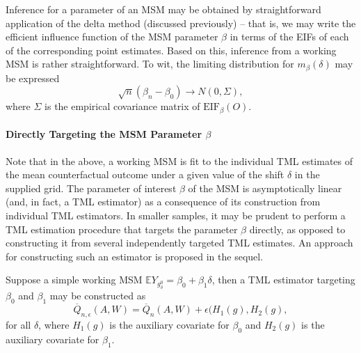 \documentclass[12pt, krantz2,]{krantz}
\newenvironment{Shaded}{\begin{snugshade}}{\end{snugshade}}
\newcommand{\CommentTok}[1]{\textcolor[rgb]{0.37,0.37,0.37}{\textit{#1}}}
\newcommand{\DecValTok}[1]{\textcolor[rgb]{0.06,0.06,0.06}{#1}}
\newcommand{\NormalTok}[1]{#1}
\newcommand{\OperatorTok}[1]{\textcolor[rgb]{0.43,0.43,0.43}{\textbf{#1}}}
\let\oldparagraph\paragraph
\renewcommand{\paragraph}[1]{\oldparagraph{#1}\mbox{}}
\theoremstyle{definition}
\theoremstyle{definition}
\theoremstyle{definition}
\newcommand{\1}{\mathbbm{1}}
\begin{document}
Inference for a parameter of an MSM may be obtained by straightforward
application of the delta method (discussed previously) -- that is, we may
write the efficient influence function of the MSM parameter \(\beta\) in terms of
the EIFs of each of the corresponding point estimates. Based on this, inference
from a working MSM is rather straightforward. To wit, the limiting distribution
for \(m_{\beta}(\delta)\) may be expressed \[\sqrt{n}(\beta_n - \beta_0) \to N(0,
\Sigma),\] where \(\Sigma\) is the empirical covariance matrix of
\(\text{EIF}_{\beta}(O)\).

\begin{Shaded}
\end{Shaded}

\hypertarget{directly-targeting-the-msm-parameter-beta}{%
\paragraph{\texorpdfstring{Directly Targeting the MSM Parameter \(\beta\)}{Directly Targeting the MSM Parameter \textbackslash{}beta}}\label{directly-targeting-the-msm-parameter-beta}}

Note that in the above, a working MSM is fit to the individual TML estimates of
the mean counterfactual outcome under a given value of the shift \(\delta\) in the
supplied grid. The parameter of interest \(\beta\) of the MSM is asymptotically
linear (and, in fact, a TML estimator) as a consequence of its construction from
individual TML estimators. In smaller samples, it may be prudent to perform a
TML estimation procedure that targets the parameter \(\beta\) directly, as opposed
to constructing it from several independently targeted TML estimates. An
approach for constructing such an estimator is proposed in the sequel.

Suppose a simple working MSM \(\mathbb{E}Y_{g^0_{\delta}} = \beta_0 + \beta_1 \delta\), then a TML estimator targeting \(\beta_0\) and \(\beta_1\) may be
constructed as
\[\overline{Q}_{n, \epsilon}(A,W) = \overline{Q}_n(A,W) + \epsilon (H_1(g),
H_2(g),\] for all \(\delta\), where \(H_1(g)\) is the auxiliary covariate for
\(\beta_0\) and \(H_2(g)\) is the auxiliary covariate for \(\beta_1\).
\end{document}
